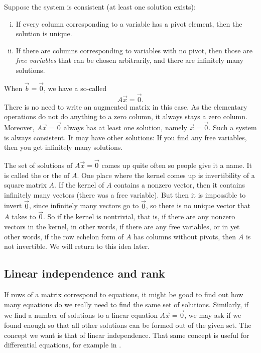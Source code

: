 Suppose the system is consistent (at least one solution exists):
\begin{enumerate}[(i)]
\item If every column corresponding to a variable has a pivot element,
then the solution is unique.
\item If there are columns corresponding to variables with no pivot,
then those are \emph{free variables} that can be chosen
arbitrarily, and there are infinitely many solutions.
\end{enumerate}

\medskip

When $\vec{b} = \vec{0}$, we have a so-called
\emph{}
\begin{equation*}
A \vec{x} = \vec{0} .
\end{equation*}
There is no need to write an augmented matrix in this
case.  As the elementary operations do not do anything to a zero column, it
always stays a zero column.  Moreover, $A \vec{x} = \vec{0}$ always has at
least one solution, namely $\vec{x} = \vec{0}$.  Such a system
is always consistent.  It may have other solutions:  If you find
any free variables, then you get infinitely many solutions.

The set of solutions of $A \vec{x} = \vec{0}$ comes up quite often
so people give it a name.  It is called the
\emph{} or the 
\emph{} of $A$.
One place where the kernel comes up is invertibility of a square matrix $A$.
If the kernel of $A$ contains a nonzero vector, then it contains
infinitely many vectors (there was a free variable).  But then it is
impossible to invert $\vec{0}$, since infinitely many vectors go to
$\vec{0}$, so there is no unique vector that $A$ takes to $\vec{0}$.
So if the kernel is nontrivial, that is, if there are any nonzero vectors in
the kernel,
in other words, if there are any free variables, or in yet other words,
if the row echelon form of $A$ has columns without pivots,
then $A$ is not invertible.  We will return to this idea later.

\subsection{Linear independence and rank}

If rows of a matrix correspond to equations, it might be good to find out
how many equations do we really need to find the same set of solutions.
Similarly, if we find a number of solutions to a linear equation
$A \vec{x} = \vec{0}$, we may ask if we found enough 
so that all other solutions can be formed out of the given set.
The concept we want is that of linear independence.
That same concept is useful for differential equations, for
example in .

